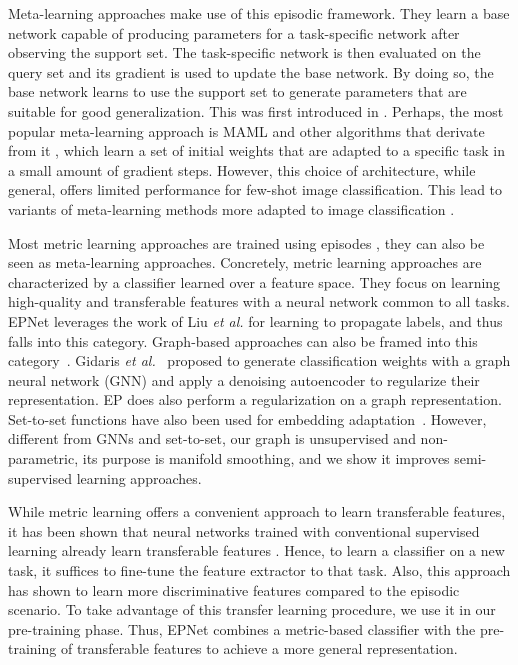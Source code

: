 \documentclass[runningheads]{llncs}
\begin{document}
Meta-learning approaches make use of this episodic framework. They learn a base network capable of producing parameters for a task-specific network after observing the support set. The task-specific network is then evaluated on the query set and its gradient is used to update the base network. By doing so, the base network learns to use the support set to generate parameters that are suitable for good generalization. This was first introduced in \cite{ravi2016optimization}. Perhaps, the most popular meta-learning approach is MAML \cite{finn2017model} and other algorithms that derivate from it \cite{nichol2018reptile,rajeswaran2019meta},
which learn a set of initial weights that are adapted to a specific task in a small amount of gradient steps. However, this choice of architecture, while general, offers limited performance for few-shot image classification. This lead to variants of meta-learning methods more adapted to image classification \cite{oreshkin2018tadam,rusu2018meta,gidaris2018dynamic,qiao2018few}.

Most metric learning approaches are trained using episodes \cite{vinyals2016matching,snell2017prototypical,liu2018learning}, they can also be seen as meta-learning approaches. Concretely, metric learning approaches are characterized by a classifier learned over a feature space. They focus on learning high-quality and transferable features with a neural network common to all tasks. EPNet leverages the work of Liu \emph{et al.} \cite{liu2018learning} for learning to propagate labels, and thus falls into this category. Graph-based approaches can also be framed into this category~\cite{garcia2018fewshot,hu2020exploiting,yang2020dpgn,kye2020transductive}. Gidaris \textit{et al.}~\cite{gidaris2019generating} proposed to generate classification weights with a graph neural network (GNN) and apply a denoising autoencoder to regularize their representation. EP does also perform a regularization on a graph representation. Set-to-set functions have also been used for embedding adaptation~\cite{ye2020few}. However, different from GNNs and set-to-set, our graph is unsupervised and non-parametric, its purpose is manifold smoothing, and we show it improves semi-supervised learning approaches.

While metric learning offers a convenient approach to learn transferable features, it has been shown that neural networks trained with conventional supervised learning already learn transferable features \cite{bauer2017discriminative,chen2018a,mangla2019charting}. Hence, to learn a classifier on a new task, it suffices to fine-tune the feature extractor to that task. Also, this approach has shown to learn more discriminative features compared to the episodic scenario. To take advantage of this transfer learning procedure, we use it in our pre-training phase. Thus,  EPNet combines a metric-based classifier with the pre-training of transferable features to achieve a more general representation.
\end{document}
